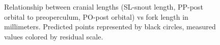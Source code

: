 \documentclass[12pt]{article}\usepackage[]{graphicx}\usepackage[]{color}
\begin{document}
\begin{figure}[htb]

 \hfill{}

\caption{Relationship between cranial lengths (SL-snout length, PP-post orbital to preoperculum, PO-post orbital) vs fork length in millimeters. Predicted points represented by black circles, measured values colored by residual scale.}\label{fig:figure3}
\end{figure}
\end{document}
